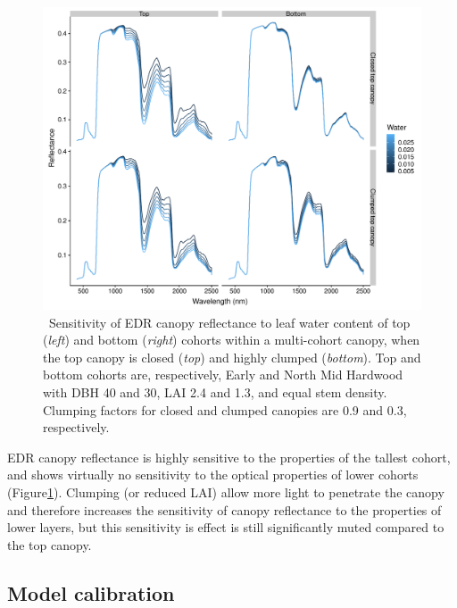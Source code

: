 \begin{figure}
  \centering
  \includegraphics[width=\textwidth]{4_edr/figures/explore_spectra/edr_sensitivity_double.pdf}
  \caption{\
    Sensitivity of EDR canopy reflectance to leaf water content of top (\textit{left}) and bottom (\textit{right}) cohorts within a multi-cohort canopy,
    when the top canopy is closed (\textit{top}) and highly clumped (\textit{bottom}).
    Top and bottom cohorts are, respectively, Early and North Mid Hardwood with DBH 40 and 30, LAI 2.4 and 1.3, and equal stem density.
    Clumping factors for closed and clumped canopies are 0.9 and 0.3, respectively.
  }\label{fig:sensitivity_water_multi}
\end{figure}

EDR canopy reflectance is highly sensitive to the properties of the tallest cohort, and shows virtually no sensitivity to the optical properties of lower cohorts (Figure\ref{fig:sensitivity_water_multi}).
Clumping (or reduced LAI) allow more light to penetrate the canopy and therefore increases the sensitivity of canopy reflectance to the properties of lower layers, but this sensitivity is effect is still significantly muted compared to the top canopy.


\subsection{Model calibration}

